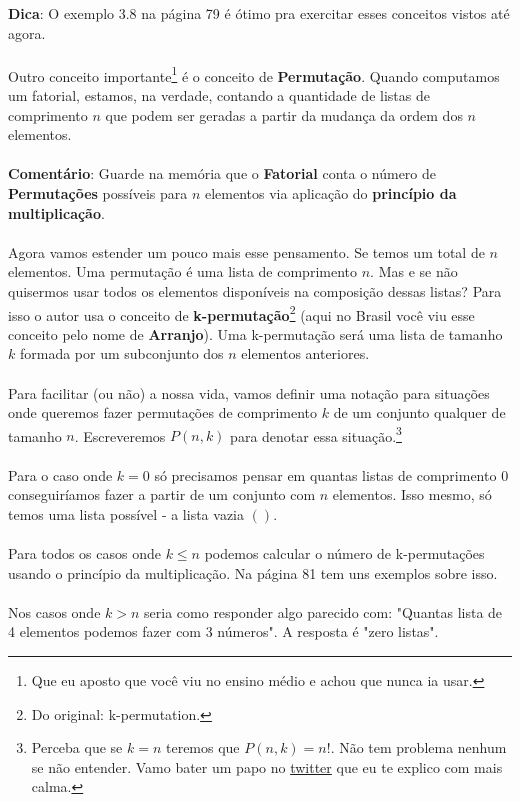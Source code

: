 \documentclass[main.tex]{subfiles}
\begin{document}
\textbf{Dica}: O exemplo 3.8 na página 79 é ótimo pra exercitar esses conceitos vistos até agora.
\\~\\
Outro conceito importante\footnote{Que eu aposto que você viu no ensino médio e achou que nunca ia usar.} é o conceito de \textbf{Permutação}. Quando computamos um fatorial, estamos, na verdade, contando a quantidade de listas de comprimento $n$ que podem ser geradas a partir da mudança da ordem dos $n$ elementos.
\\~\\
\textbf{Comentário}: Guarde na memória que o \textbf{Fatorial} conta o número de \textbf{Permutações} possíveis para $n$ elementos via aplicação do \textbf{princípio da multiplicação}.
\\~\\
Agora vamos estender um pouco mais esse pensamento. Se temos um total de $n$ elementos. Uma permutação é uma lista de comprimento $n$. Mas e se não quisermos usar todos os elementos disponíveis na composição dessas listas? Para isso o autor usa o conceito de \textbf{k-permutação}\footnote{Do original: k-permutation.} (aqui no Brasil você viu esse conceito pelo nome de \textbf{Arranjo}). Uma k-permutação será uma lista de tamanho $k$ formada por um subconjunto dos $n$ elementos anteriores.
\\~\\
Para facilitar (ou não) a nossa vida, vamos definir uma notação para situações onde queremos fazer permutações de comprimento $k$ de um conjunto qualquer de tamanho $n$. Escreveremos $P(n,k)$ para denotar essa situação.\footnote{Perceba que se $k = n$ teremos que $P(n,k) = n!$. Não tem problema nenhum se não entender. Vamo bater um papo no \href{https://twitter.com/bruno_ruas2}{twitter} que eu te explico com mais calma.} 
\\~\\
Para o caso onde $k = 0$ só precisamos pensar em quantas listas de comprimento $0$ conseguiríamos fazer a partir de um conjunto com $n$ elementos. Isso mesmo, só temos uma lista possível - a lista vazia $()$. 
\\~\\
Para todos os casos onde $k \leq n$ podemos calcular o número de k-permutações usando o princípio da multiplicação. Na página 81 tem uns exemplos sobre isso.
\\~\\
Nos casos onde $k > n$ seria como responder algo parecido com: "Quantas lista de 4 elementos podemos fazer com 3 números". A resposta é "zero listas".
\end{document}
